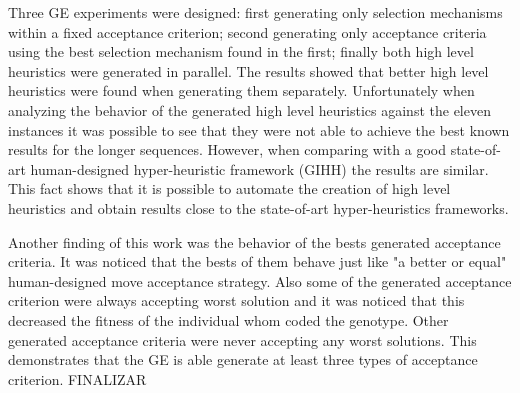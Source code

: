 \documentclass[conference]{IEEEtran}
\begin{document}
Three GE experiments were designed: first generating only selection mechanisms within a fixed acceptance criterion; second generating only acceptance criteria using the best selection mechanism found in the first; finally both high level heuristics were generated in parallel. The results showed that better high level heuristics were found when generating them separately. Unfortunately when analyzing the behavior of the generated high level heuristics against the eleven instances it was possible to see that they were not able to achieve the best known results for the longer sequences. However, when comparing with a good state-of-art human-designed hyper-heuristic framework (GIHH) \cite{misir2012intelligent} the results are similar. This fact shows that it is possible to automate the creation of high level heuristics and obtain results close to the state-of-art hyper-heuristics frameworks.

 Another finding of this work was the behavior of the bests generated acceptance criteria. It was noticed that the bests of them behave just like "a better or equal" human-designed move acceptance strategy. Also some of the generated acceptance criterion were always accepting worst solution and it was noticed that this decreased the fitness of the individual whom coded the genotype. Other generated acceptance criteria were never accepting any worst solutions. This demonstrates that the GE is able generate at least three types of acceptance criterion.  
 FINALIZAR
  











%
%
%
	
	



\end{document}
